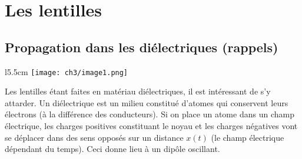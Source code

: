\chapter{Les lentilles}

\setcounter{section}{-1}
\section{Propagation dans les diélectriques (rappels)}
\begin{wrapfigure}[10]{l}{5.5cm}
	\vspace{-5mm}
	\texttt{[image: ch3/image1.png]}
	\end{wrapfigure}	
Les lentilles étant faites en matériau diélectriques, il est intéressant de s'y attarder. Un diélectrique 
est un milieu constitué d'atomes qui conservent leurs électrons (à la différence des conducteurs). Si on 
place un atome dans un champ électrique, les charges positives constituant le noyau et les charges négatives
vont se déplacer dans des sens opposés sur 
un distance $x(t)$ (le champ électrique dépendant du temps). Ceci donne lieu à un dipôle oscillant.\\

